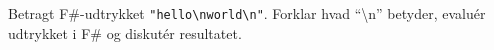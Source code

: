 Betragt F\#-udtrykket \lstinline{"hello\nworld\n"}. Forklar hvad ``\textbackslash n'' betyder, evalu\'{e}r udtrykket i F\# og diskut\'{e}r resultatet.